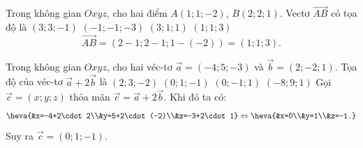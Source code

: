 \begin{ex}%
	Trong không gian $Oxyz$, cho hai điểm $A(1;1;-2)$, $B(2;2;1)$. Vectơ $\overrightarrow{AB}$ có tọa độ là
	\choice
	{$(3;3;-1)$}
	{$(-1;-1;-3)$}
	{$(3;1;1)$}
	{\True$(1;1;3)$}
	\loigiai 
	{
		$$\overrightarrow{AB}=(2-1;2-1;1-(-2))=(1;1;3).$$
	}
\end{ex}

\begin{ex}%
	Trong không gian $Oxyz$, cho hai véc-tơ $\overrightarrow{a}=(-4;5;-3)$ và $\overrightarrow{b}=(2;-2;1)$. Tọa độ của véc-tơ $\overrightarrow{a}+2\overrightarrow{b}$ là
	\choice
	{$(2;3;-2)$}
	{\True$(0;1;-1)$}
	{ $(0;-1;1)$}
	{$(-8;9;1)$}
	\loigiai 
	{
		Gọi $\overrightarrow{c}=(x;y;z)$ thỏa mãn $\overrightarrow{c}=\overrightarrow{a}+2\overrightarrow{b}$. Khi đó ta có:
		$$\heva{&x=-4+2\cdot 2\\&y=5+2\cdot(-2)\\&z=-3+2\cdot 1}\Leftrightarrow \heva{&x=0\\&y=1\\&z=-1.} $$
		Suy ra $\overrightarrow{c}=(0;1;-1)$.
	}
\end{ex}

